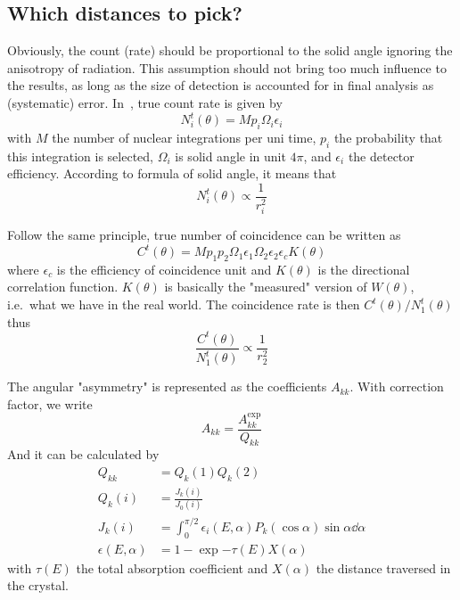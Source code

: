 \subsection{Which distances to pick?}
Obviously, the count (rate) should be proportional to the solid angle ignoring the anisotropy of radiation. This assumption should not bring too much influence to the results, as long as the size of detection is accounted for in final analysis as (systematic) error. In~\cite{siegbahn}, true count rate is given by
\begin{equation}
   N^t_i (\theta) = M p_i \Omega_i \epsilon_i
\end{equation}
with $M$ the number of nuclear integrations per uni time, $p_i$ the probability that this integration is selected, $\Omega_i$ is solid angle in unit $4\pi$, and $\epsilon_i$ the detector efficiency. According to formula of solid angle, it means that
\begin{equation}
   N^t_i (\theta) \propto \frac{1}{r_i^2}
\end{equation}

Follow the same principle, true number of coincidence can be written as~\cite{siegbahn}
\begin{equation}
   C^t(\theta) = M p_1 p_2 \Omega_1 \epsilon_1 \Omega_2 \epsilon_2 \epsilon_c K(\theta)
\end{equation}
where $\epsilon_c$ is the efficiency of coincidence unit and $K(\theta)$ is the directional correlation function. $K(\theta)$ is basically the "measured" version of $W(\theta)$, i.e.~what we have in the real world. 
The coincidence rate is then $C^t(\theta)/ N_1^t(\theta)$ thus 
\begin{equation}
   \frac{C^t(\theta)}{N_1^t(\theta)} \propto \frac{1}{r_2^2}
\end{equation}

The angular "asymmetry" is represented as the coefficients $A_{kk}$. With correction factor, we write
\begin{equation}
   A_{kk} = \frac{A_{kk}^\text{exp}}{Q_{kk}}
\end{equation}
And it can be calculated by~\cite{siegbahn}
\begin{align}
   Q_{kk} &= Q_k(1) Q_k(2) \\
   Q_k(i) &= \frac{J_k(i)}{J_0(i)} \\
   J_k(i) &= \int_0^{\pi/2} \epsilon_i (E,\alpha) P_k (\cos\alpha) \sin \alpha \dd{\alpha} \\
   \epsilon(E,\alpha) &= 1 - \exp{- \tau (E) X(\alpha)}
\end{align}
with $\tau (E)$ the total absorption coefficient and $X(\alpha)$ the distance traversed in the crystal.


